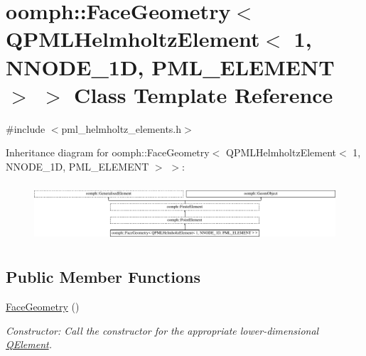 \hypertarget{classoomph_1_1FaceGeometry_3_01QPMLHelmholtzElement_3_011_00_01NNODE__1D_00_01PML__ELEMENT_01_4_01_4}{}\section{oomph\+:\+:Face\+Geometry$<$ Q\+P\+M\+L\+Helmholtz\+Element$<$ 1, N\+N\+O\+D\+E\+\_\+1D, P\+M\+L\+\_\+\+E\+L\+E\+M\+E\+NT $>$ $>$ Class Template Reference}
\label{classoomph_1_1FaceGeometry_3_01QPMLHelmholtzElement_3_011_00_01NNODE__1D_00_01PML__ELEMENT_01_4_01_4}


{\ttfamily \#include $<$pml\+\_\+helmholtz\+\_\+elements.\+h$>$}

Inheritance diagram for oomph\+:\+:Face\+Geometry$<$ Q\+P\+M\+L\+Helmholtz\+Element$<$ 1, N\+N\+O\+D\+E\+\_\+1D, P\+M\+L\+\_\+\+E\+L\+E\+M\+E\+NT $>$ $>$\+:\begin{figure}[H]
\begin{center}
\leavevmode
\includegraphics[height=2.187500cm]{classoomph_1_1FaceGeometry_3_01QPMLHelmholtzElement_3_011_00_01NNODE__1D_00_01PML__ELEMENT_01_4_01_4}
\end{center}
\end{figure}
\subsection*{Public Member Functions}
\begin{DoxyCompactItemize}
\item 
\hyperlink{classoomph_1_1FaceGeometry_3_01QPMLHelmholtzElement_3_011_00_01NNODE__1D_00_01PML__ELEMENT_01_4_01_4_a6af5dd5e57ad9bf66145033ad0146e7e}{Face\+Geometry} ()
\begin{DoxyCompactList}\small\item\em Constructor\+: Call the constructor for the appropriate lower-\/dimensional \hyperlink{classoomph_1_1QElement}{Q\+Element}. \end{DoxyCompactList}\end{DoxyCompactItemize}
